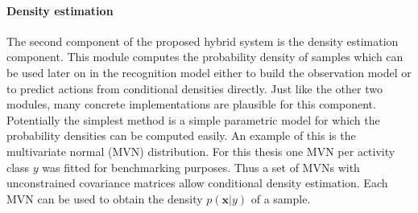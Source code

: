 \documentclass[11pt,titlepage,oneside,openany]{book}
\begin{document}
\paragraph{Density estimation}
The second component of the proposed hybrid system is the density estimation component. This module computes the probability density of samples which can be used later on in the recognition model either to build the observation model or to predict actions from conditional densities directly. Just like the other two modules, many concrete implementations are plausible for this component. Potentially the simplest method is a simple parametric model for which the probability densities can be computed easily. An example of this is the multivariate normal (MVN) distribution. For this thesis one MVN per activity class $y$ was fitted for benchmarking purposes. Thus a set of MVNs with unconstrained covariance matrices allow conditional density estimation. Each MVN can be used to obtain the density $p(\pmb{x}|y)$ of a sample.
\end{document}
